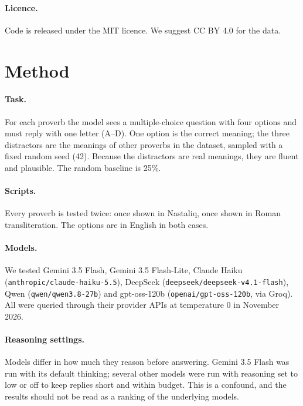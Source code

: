 \documentclass[11pt]{article}
\begin{document}
\paragraph{Licence.} Code is released under the MIT licence. We suggest CC BY 4.0 for the data.

\section{Method}
\paragraph{Task.} For each proverb the model sees a multiple-choice question with four options and must reply with one letter (A--D). One option is the correct meaning; the three distractors are the meanings of other proverbs in the dataset, sampled with a fixed random seed (42). Because the distractors are real meanings, they are fluent and plausible. The random baseline is 25\%.

\paragraph{Scripts.} Every proverb is tested twice: once shown in Nastaliq, once shown in Roman transliteration. The options are in English in both cases.

\paragraph{Models.} We tested Gemini 3.5 Flash, Gemini 3.5 Flash-Lite, Claude Haiku (\texttt{anthropic/claude-haiku-5.5}), DeepSeek (\texttt{deepseek/deepseek-v4.1-flash}), Qwen (\texttt{qwen/qwen3.8-27b}) and gpt-oss-120b (\texttt{openai/gpt-oss-120b}, via Groq). All were queried through their provider APIs at temperature 0 in November 2026.

\paragraph{Reasoning settings.} Models differ in how much they reason before answering. Gemini 3.5 Flash was run with its default thinking; several other models were run with reasoning set to low or off to keep replies short and within budget. This is a confound, and the results should not be read as a ranking of the underlying models.
\end{document}
